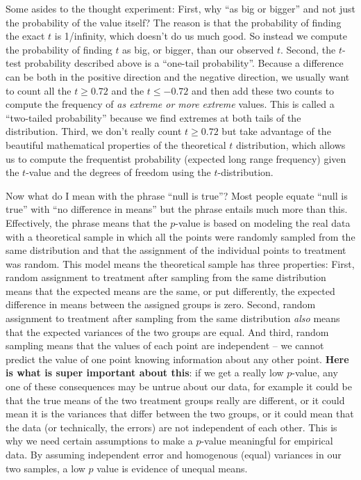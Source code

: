 \documentclass[]{book}
\theoremstyle{definition}
\theoremstyle{definition}
\theoremstyle{definition}
\theoremstyle{remark}
\begin{document}
Some asides to the thought experiment: First, why ``as big or bigger''
and not just the probability of the value itself? The reason is that the
probability of finding the exact \(t\) is 1/infinity, which doesn't do
us much good. So instead we compute the probability of finding \(t\) as
big, or bigger, than our observed \(t\). Second, the \(t\)-test
probability described above is a ``one-tail probability''. Because a
difference can be both in the positive direction and the negative
direction, we usually want to count all the \(t \ge 0.72\) and the
\(t \le -0.72\) and then add these two counts to compute the frequency
of \emph{as extreme or more extreme} values. This is called a
``two-tailed probability'' because we find extremes at both tails of the
distribution. Third, we don't really count \(t \ge 0.72\) but take
advantage of the beautiful mathematical properties of the theoretical
\(t\) distribution, which allows us to compute the frequentist
probability (expected long range frequency) given the \(t\)-value and
the degrees of freedom using the \(t\)-distribution.

Now what do I mean with the phrase ``null is true''? Most people equate
``null is true'' with ``no difference in means'' but the phrase entails
much more than this. Effectively, the phrase means that the \(p\)-value
is based on modeling the real data with a theoretical sample in which
all the points were randomly sampled from the same distribution and that
the assignment of the individual points to treatment was random. This
model means the theoretical sample has three properties: First, random
assignment to treatment after sampling from the same distribution means
that the expected means are the same, or put differently, the expected
difference in means between the assigned groups is zero. Second, random
assignment to treatment after sampling from the same distribution
\emph{also} means that the expected variances of the two groups are
equal. And third, random sampling means that the values of each point
are independent -- we cannot predict the value of one point knowing
information about any other point. \textbf{Here is what is super
important about this}: if we get a really low \(p\)-value, any one of
these consequences may be untrue about our data, for example it could be
that the true means of the two treatment groups really are different, or
it could mean it is the variances that differ between the two groups, or
it could mean that the data (or technically, the errors) are not
independent of each other. This is why we need certain assumptions to
make a \(p\)-value meaningful for empirical data. By assuming
independent error and homogenous (equal) variances in our two samples, a
low \(p\) value is evidence of unequal means.
\end{document}
